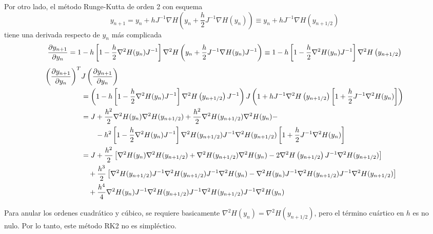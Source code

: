 Por otro lado, el método Runge-Kutta de orden 2 con esquema
\[ y_{n+1} = y_n + h J^{-1} \nabla H\left(y_n + \frac{h}{2} J^{-1} \nabla H(y_n) \right) \equiv y_n + h J^{-1} \nabla H\left(y_{n+1/2} \right) \]
tiene una derivada respecto de $y_n$ más complicada
\[ \frac{\partial y_{n+1}}{\partial y_n} =  1 - h\left[ 1 - \frac{h}{2} \nabla^2 H(y_n)J^{-1} \right]\nabla^2H\left(y_n + \frac{h}{2} J^{-1} \nabla H(y_n)J^{-1} \right) \equiv 1 - h\left[ 1 - \frac{h}{2} \nabla^2 H(y_n)J^{-1} \right]\nabla^2H\left(y_{n+1/2} \right) \]
\begin{align*}
 \left( \frac{\partial y_{n+1}}{\partial y_n} \right)^T &J \left( \frac{\partial y_{n+1}}{\partial y_n} \right) \\
 &= \left( 1 - h\left[ 1 - \frac{h}{2} \nabla^2 H(y_n)J^{-1} \right]\nabla^2H\left(y_{n+1/2} \right)J^{-1} \right) J \left(1 + hJ^{-1}\nabla^2H\left(y_{n+1/2} \right)\left[ 1 + \frac{h}{2} J^{-1} \nabla^2 H(y_n) \right] \right)\\
 &= J + \frac{h^2}{2} \nabla^2 H(y_n)\nabla^2H(y_{n+1/2}) + \frac{h^2}{2} \nabla^2H(y_{n+1/2})\nabla^2 H(y_n) -\\
 &\qquad - h^2\left[ 1 - \frac{h}{2} \nabla^2 H(y_n)J^{-1} \right]\nabla^2H(y_{n+1/2}) J^{-1}\nabla^2H(y_{n+1/2})\left[ 1 + \frac{h}{2} J^{-1} \nabla^2 H(y_n) \right] \\
 &= J + \frac{h^2}{2} \left[ \nabla^2 H(y_n)\nabla^2H(y_{n+1/2}) +  \nabla^2H(y_{n+1/2})\nabla^2 H(y_n) - 2\nabla^2H\left(y_{n+1/2} \right) J^{-1}\nabla^2H(y_{n+1/2}) \right] \\
 &\quad + \frac{h^3}{2} \left[ \nabla^2H(y_{n+1/2}) J^{-1}\nabla^2H(y_{n+1/2})J^{-1} \nabla^2 H(y_n) - \nabla^2 H(y_n)J^{-1}\nabla^2H(y_{n+1/2}) J^{-1}\nabla^2H(y_{n+1/2})\right] \\
 &\quad + \frac{h^4}{4} \nabla^2 H(y_n)J^{-1}\nabla^2H(y_{n+1/2}) J^{-1}\nabla^2H(y_{n+1/2})J^{-1}\nabla^2 H(y_n)
\end{align*}

Para anular los ordenes cuadrático y cúbico, se requiere basicamente $\nabla^2H(y_n) = \nabla^2H(y_{n+1/2})$, pero el término cuártico en $h$ es no nulo.
Por lo tanto, este método RK2 no es simpléctico.

